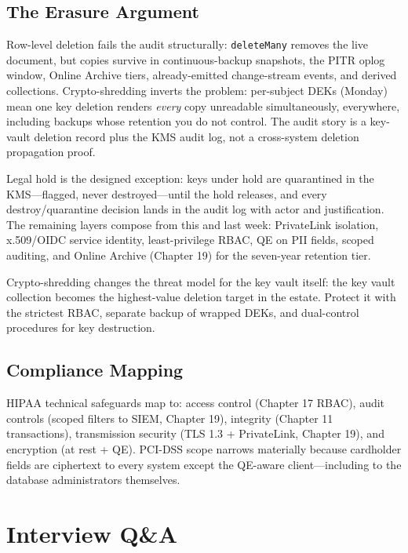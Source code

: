\subsection{The Erasure Argument}
Row-level deletion fails the audit structurally: \texttt{deleteMany} removes the live document, but copies survive in continuous-backup snapshots, the PITR oplog window, Online Archive tiers, already-emitted change-stream events, and derived collections. Crypto-shredding inverts the problem: per-subject DEKs (Monday) mean one key deletion renders \emph{every} copy unreadable simultaneously, everywhere, including backups whose retention you do not control. The audit story is a key-vault deletion record plus the KMS audit log, not a cross-system deletion propagation proof.

Legal hold is the designed exception: keys under hold are quarantined in the KMS---flagged, never destroyed---until the hold releases, and every destroy/quarantine decision lands in the audit log with actor and justification. The remaining layers compose from this and last week: PrivateLink isolation, x.509/OIDC service identity, least-privilege RBAC, QE on PII fields, scoped auditing, and Online Archive (Chapter 19) for the seven-year retention tier.

\begin{notebox}
Crypto-shredding changes the threat model for the key vault itself: the key vault collection becomes the highest-value deletion target in the estate. Protect it with the strictest RBAC, separate backup of wrapped DEKs, and dual-control procedures for key destruction.
\end{notebox}

\subsection{Compliance Mapping}
HIPAA technical safeguards map to: access control (Chapter 17 RBAC), audit controls (scoped filters to SIEM, Chapter 19), integrity (Chapter 11 transactions), transmission security (TLS 1.3 + PrivateLink, Chapter 19), and encryption (at rest + QE). PCI-DSS scope narrows materially because cardholder fields are ciphertext to every system except the QE-aware client---including to the database administrators themselves.

\section{Interview Q\&A}
